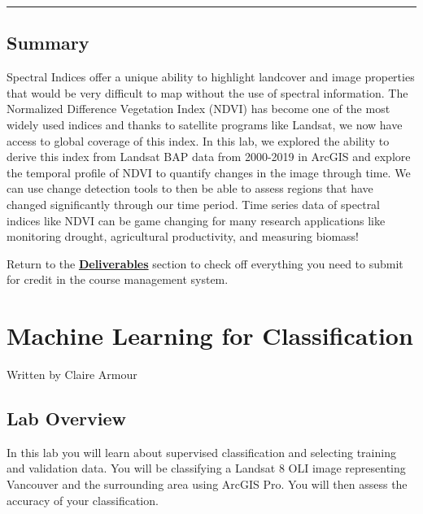 \documentclass[
]{book}
\begin{document}
\begin{center}\rule{0.5\linewidth}{0.5pt}\end{center}

\hypertarget{summary-5}{%
\section*{Summary}\label{summary-5}}

Spectral Indices offer a unique ability to highlight landcover and image properties that would be very difficult to map without the use of spectral information. The Normalized Difference Vegetation Index (NDVI) has become one of the most widely used indices and thanks to satellite programs like Landsat, we now have access to global coverage of this index. In this lab, we explored the ability to derive this index from Landsat BAP data from 2000-2019 in ArcGIS and explore the temporal profile of NDVI to quantify changes in the image through time. We can use change detection tools to then be able to assess regions that have changed significantly through our time period. Time series data of spectral indices like NDVI can be game changing for many research applications like monitoring drought, agricultural productivity, and measuring biomass!

Return to the \protect\hyperlink{lab7-deliverables}{\textbf{Deliverables}} section to check off everything you need to submit for credit in the course management system.

\hypertarget{machine-learning-for-classification}{%
\chapter{Machine Learning for Classification}\label{machine-learning-for-classification}}

Written by
Claire Armour

\hypertarget{lab-overview-6}{%
\section*{Lab Overview}\label{lab-overview-6}}

In this lab you will learn about supervised classification and selecting training and validation data. You will be classifying a Landsat 8 OLI image representing Vancouver and the surrounding area using ArcGIS Pro. You will then assess the accuracy of your classification.
\end{document}
